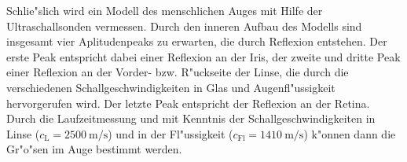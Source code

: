 	Schlie"slich wird ein Modell des menschlichen Auges mit Hilfe der Ultraschallsonden vermessen.
	Durch den inneren Aufbau des Modells sind insgesamt vier Aplitudenpeaks zu erwarten, die durch Reflexion entstehen.
	Der erste Peak entspricht dabei einer Reflexion an der Iris, der zweite und dritte Peak einer Reflexion an der Vorder- bzw. R"uckseite der Linse, die durch die verschiedenen Schallgeschwindigkeiten in Glas und Augenfl"ussigkeit hervorgerufen wird.
	Der letzte Peak entspricht der Reflexion an der Retina.
	Durch die Laufzeitmessung und mit Kenntnis der Schallgeschwindigkeiten in Linse ($c_\mathrm{L} = \SI{2500}{\meter \per \second}$) und in der Fl"ussigkeit ($c_\mathrm{Fl} = \SI{1410}{\meter \per \second}$) k"onnen dann die Gr"o"sen im Auge bestimmt werden.